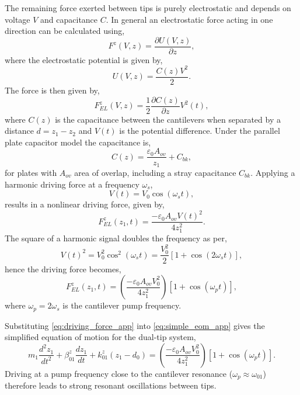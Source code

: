 \documentclass[12pt, a4paper, twoside]{book}
\begin{document}
The remaining force exerted between tips is purely electrostatic and depends on voltage $V$ and capacitance $C$. In general an electrostatic force acting in one direction can be calculated using,
\begin{equation} F^z(V,z) = \frac{\partial U(V,z)}{\partial z}, \end{equation}
where the electrostatic potential is given by,
\begin{equation} U(V,z) = \frac{C(z)V^2}{2}. \end{equation}
The force is then given by,
\begin{equation} F_{EL}^z(V,z) = \frac{1}{2} \frac{\partial C(z)}{\partial z} V^2(t), \end{equation}
where $C(z)$ is the capacitance between the cantilevers when separated by a distance $d=z_1-z_2$ and $V(t)$ is the potential difference. Under the parallel plate capacitor model the capacitance is,
\begin{equation} C(z) = \frac{\varepsilon_0 A_{ov}}{z_1} + C_{bk}, \end{equation}
for plates with $A_{ov}$ area of overlap, including a stray capacitance $C_{bk}$. Applying a harmonic driving force at a frequency $\omega_s$,
\begin{equation} V(t)=V_0 \cos(\omega_s t), \end{equation}
results in a nonlinear driving force, given by,
\begin{equation} F_{EL}^z(z_1,t) = \frac{-\varepsilon_0 A_{ov} V(t)^2}{4z_1^2}. \end{equation}
The square of a harmonic signal doubles the frequency as per,
\begin{equation} V(t)^2 = V_0^2\cos^2(\omega_st) = \frac{V_0^2}{2}\left[1+\cos(2\omega_st)\right], \end{equation}
hence the driving force becomes,
\begin{equation}
	F_{EL}^z(z_1,t) = \left(\frac{-\varepsilon_0 A_{ov} V_0^2}{4z_1^2}\right)\left[1+\cos(\omega_pt)\right],
\label{eq:driving_force_app}
\end{equation}
where $\omega_p = 2\omega_s$ is the cantilever pump frequency.

Substituting \eqref{eq:driving_force_app} into \eqref{eq:simple_eom_app} gives the simplified equation of motion for the dual-tip system,
\begin{equation}
	m_1 \frac{d^2z_1}{dt^2} + \beta_{01}^z \frac{dz_1}{dt} + k_{01}^z (z_1-d_0) = \left( \frac{-\varepsilon_0 A_{ov} V_0^2}{4z_1^2}\right)\left[1+\cos(\omega_pt)\right].
\label{eq:final_eom_app}
\end{equation}
Driving at a pump frequency close to the cantilever resonance ($\omega_p \approx \omega_{01}$) therefore leads to strong resonant oscillations between tips.
 
\end{document}
